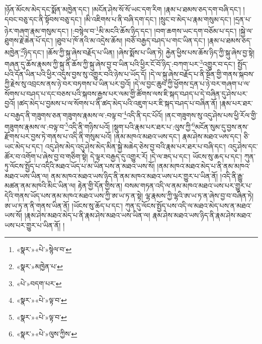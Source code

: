 །ཉོན་མོངས་མེད་དང་སྨོན་མཁྱེན་དང་། །མངོན་ཤེས་སོ་སོ་ཡང་དག་རིག །རྣམ་པ་ཐམས་ཅད་དག་བཞི་དང་། །དབང་བཅུ་དང་ནི་སྟོབས་བཅུ་དང་། །མི་འཇིགས་པ་ནི་བཞི་དག་དང་། །སྲུང་བ་མེད་པ་རྣམ་གསུམ་དང་། །དྲན་པ་ཉེར་གཞག་རྣམ་གསུམ་དང་། །:བསྙེལ་བ་\footnote{«སྣར་»«པེ་»སྙེལ་བ་}མི་མངའི་ཆོས་ཉིད་དང་། །བག་ཆགས་ཡང་དག་བཅོམ་པ་དང་། །སྐྱེ་ལ་ཐུགས་རྗེ་ཆེན་པོ་དང་། །ཐུབ་པ་ཁོ་ནའི་མ་འདྲེས་ཆོས། །བཅོ་བརྒྱད་བཤད་པ་གང་ཡིན་དང་། །རྣམ་པ་ཐམས་ཅད་མཁྱེན་\footnote{«སྣར་»མཁྱེན་པ་}ཉིད་དང་། །ཆོས་ཀྱི་སྐུ་ཞེས་བརྗོད་པ་ཡིན། །ཞེས་སྨོས་པ་ཡིན་ཏེ། རྐྱེན་ཕྱིས་པས་ཆོས་ཉིད་ཀྱི་སྐུ་ཞེས་བྱ་སྟེ། གཞན་དུ་ཆོས་རྣམས་ཀྱི་སྐུ་ནི་ཆོས་ཀྱི་སྐུ་ཞེས་བྱ་བ་ཡིན་པའི་ཕྱིར་ངོ་བོ་ཉིད་:བཀག་པར་\footnote{«པེ་»བདག་པར་}འགྱུར་བ་དང་། སྤྱོད་པའི་དོན་ཡིན་པའི་ཕྱིར་འདུས་བྱས་སུ་འགྱུར་བའི་ཉེས་པ་ཡོད་དོ། །དེ་ལ་སྐུ་ཞེས་བརྗོད་པ་ནི་སྔོན་གྱི་གནས་སྐབས་ཀྱི་རྗེས་སུ་འབྲངས་ནས་ཉེ་བར་བཏགས་པ་ཡིན་པར་བྱའོ། །དེ་ལ་བྱང་ཆུབ་ཀྱི་ཕྱོགས་དྲན་པ་ཉེ་བར་གཞག་པ་ལ་སོགས་པ་བཤད་པ་དང་བཅས་པའི་སྐབས་རྒྱས་པར་ལམ་གྱི་ཚོགས་ལས་ཇི་སྐད་བཤད་པ་དེ་བཞིན་དུ་ཤེས་པར་བྱའོ། །ཚད་མེད་པ་བྱམས་པ་ལ་སོགས་པ་ནི་ཚད་མེད་པའི་འཇུག་པར་ཇི་སྐད་བཤད་པ་བཞིན་ནོ། །རྣམ་པར་ཐར་པ་བརྒྱད་ནི་གཟུགས་ཅན་གཟུགས་རྣམས་ལ་:བལྟ་བ་\footnote{«སྣར་»«པེ་»ལྟ་བ་}འདི་ནི་དང་པོའོ། །ནང་གཟུགས་སུ་འདུ་ཤེས་པས་ཕྱི་རོལ་གྱི་གཟུགས་རྣམས་ལ་:བལྟ་བ་\footnote{«སྣར་»«པེ་»ལྟ་བ་}འདི་ནི་གཉིས་པའོ། །སྡུག་པའི་རྣམ་པར་ཐར་པ་:ལུས་ཀྱི་\footnote{«སྣར་»«པེ་»ལུས་ཀྱིས་}མངོན་སུམ་དུ་བྱས་ནས་རྫོགས་པར་བྱས་ཏེ་གནས་པ་འདི་ནི་གསུམ་པའོ། །ནམ་མཁའ་མཐའ་ཡས་དང་། རྣམ་ཤེས་མཐའ་ཡས་དང་། ཅི་ཡང་མེད་པ་དང་། འདུ་ཤེས་མེད་འདུ་ཤེས་མེད་མིན་སྐྱེ་མཆེད་ཅེས་བྱ་བའི་རྣམ་པར་ཐར་པ་བཞི་དང་། འདུ་ཤེས་དང་ཚོར་བ་འགོག་པ་ཞེས་བྱ་བ་གཅིག་སྟེ། དེ་ལྟར་བརྒྱད་དུ་འགྱུར་རོ། །དེ་ལ་ཟད་པ་དང་། ཡོངས་སུ་ཆད་པ་དང་། ཀུན་ཏུ་ལོངས་སྤྱོད་པ་འདིའི་མཐའ་ཡོད་པ་མ་ཡིན་པས་ན་མཐའ་ཡས་སོ། །ནམ་མཁའ་མཐའ་མེད་པ་ནི་ནམ་མཁའ་མཐའ་ཡས་ཡིན་ལ། ནམ་མཁའ་མཐའ་ཡས་ཉིད་ནི་ནམ་མཁའ་མཐའ་ཡས་པར་གྱུར་པ་ཡིན་ནོ། །འདི་ནི་རྒྱུ་མཚན་ནམ་མཁའི་མིང་ཡིན་ལ། རྟེན་གྱི་དོན་གྱིས་ན། བསམ་གཏན་འདི་ལ་ནམ་མཁའ་མཐའ་ཡས་པར་གྱུར་པ་དེའི་གནས་ཡོད་པས་ནམ་མཁའ་མཐའ་ཡས་ཀྱི་ཨ་ཡ་ཏ་ན་སྟེ། ལྷ་རྣམས་ཀྱི་ལྷའི་ཨ་ཡ་ཏ་ན་ཞེས་བྱ་བ་བཞིན་ཏེ། ཨ་ཡ་ཏ་ན་ནི་གནས་ཡིན་ནོ། །ཡོངས་སུ་ཆོད་པ་དང་། ཀུན་དུ་ལོངས་སྤྱོད་པས་འདི་ལ་མཐའ་མེད་པས་ན་མཐའ་ཡས་སོ། །རྣམ་ཤེས་མཐའ་མེད་པ་ནི་རྣམ་ཤེས་མཐའ་ཡས་ཡིན་ལ། རྣམ་ཤེས་མཐའ་ཡས་ཉིད་ནི་རྣམ་ཤེས་མཐའ་ཡས་པར་གྱུར་པ་ཡིན་ནོ། །

